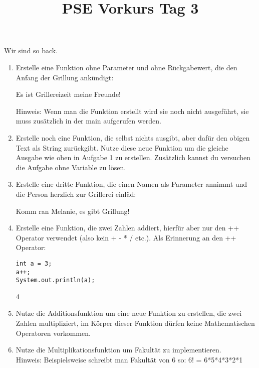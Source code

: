\documentclass{../../sheet}
\title{PSE Vorkurs Tag 3}
\begin{document}
\maketitle
Wir sind so back.

\newpage


\begin{enumerate}
    \item Erstelle eine Funktion ohne Parameter und ohne Rückgabewert, die den Anfang der Grillung ankündigt:
          \begin{ausgabe}
              Es ist Grillereizeit meine Freunde!
          \end{ausgabe}
          Hinweis: Wenn man die Funktion erstellt wird sie noch nicht ausgeführt, sie muss zusätzlich in der main aufgerufen werden.
    \item Erstelle noch eine Funktion, die selbst nichts ausgibt, aber dafür den obigen Text als String zurückgibt. Nutze diese neue Funktion um die gleiche Ausgabe wie oben in Aufgabe 1 zu erstellen. Zusätzlich kannst du versuchen die Aufgabe ohne Variable zu lösen.
    \item Erstelle eine dritte Funktion, die einen Namen als Parameter annimmt und die Person herzlich zur Grillerei einläd:
          \begin{ausgabe}
              Komm ran Melanie, es gibt Grillung!
          \end{ausgabe}
    \item Erstelle eine Funktion, die zwei Zahlen addiert, hierfür aber nur den ++ Operator verwendet (also kein + - * / etc.). Als Erinnerung an den ++ Operator:
          \begin{verbatim}
int a = 3;
a++;
System.out.println(a);
    \end{verbatim}
          \begin{ausgabe}
              4
          \end{ausgabe}
    \item Nutze die Additionsfunktion um eine neue Funktion zu erstellen, die zwei Zahlen multipliziert, im Körper dieser Funktion dürfen keine Mathematischen Operatoren vorkommen.
    \item Nutze die Multiplikationsfunktion um Fakultät zu implementieren.\\
          Hinweis: Beispielsweise schreibt man Fakultät von 6 so: 6! = 6*5*4*3*2*1
\end{enumerate}
\end{document}
